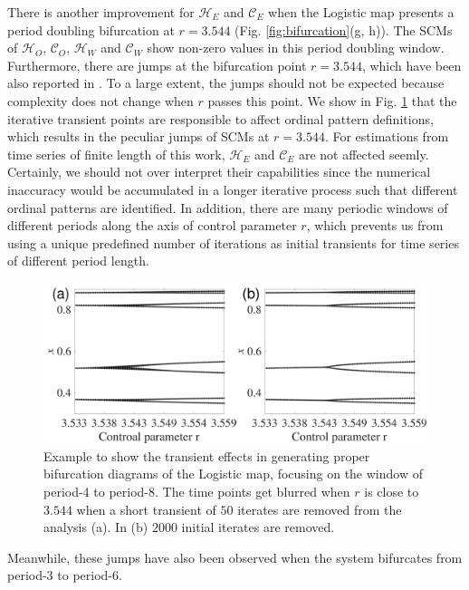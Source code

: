 \documentclass[12pt,aip,cha,reprint,nofootinbib]{revtex4-1}
\begin{document}
There is another improvement for $\mathcal{H}_E$ and $\mathcal{C}_E$ when the Logistic map presents a period doubling bifurcation at $r = 3.544$ (Fig. \ref{fig:bifurcation}(g, h)). The SCMs of $\mathcal{H}_O$,  $\mathcal{C}_O$, $\mathcal{H}_W$ and $\mathcal{C}_W$ show non-zero values in this period doubling window. Furthermore, there are jumps at the bifurcation point $r = 3.544$, which have been also reported in \cite{BandtPRL2002}. To a large extent, the jumps should not be expected because complexity does not change when $r$ passes this point. We show in Fig. \ref{fig:transient} that the iterative transient points are responsible to affect ordinal pattern definitions, which results in the peculiar jumps of SCMs at $r = 3.544$. For estimations from time series of finite length of this work, $\mathcal{H}_E$ and $\mathcal{C}_E$ are not affected seemly. Certainly, we should not over interpret their capabilities since the numerical inaccuracy would be accumulated in a longer iterative process such that different ordinal patterns are identified. In addition, there are many periodic windows of different periods along the axis of control parameter $r$, which prevents us from using a unique predefined number of iterations as initial transients for time series of different period length. 
\begin{figure}
	\centering
	\includegraphics[width=\columnwidth]{period4_exampleTransients.pdf}
\caption{\small{Example to show the transient effects in generating proper bifurcation diagrams of the Logistic map, focusing on the window of period-4 to period-8. The time points get blurred when $r$ is close to $3.544$ when a short transient of $50$ iterates are removed from the analysis (a). In (b) $2000$ initial iterates are removed. }\label{fig:transient}}
\end{figure}
Meanwhile, these jumps have also been observed when the system bifurcates from period-3 to period-6. 
\end{document}
